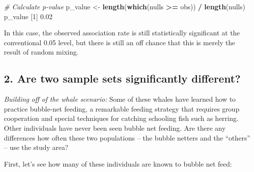 \documentclass[]{book}
\newenvironment{Shaded}{\begin{snugshade}}{\end{snugshade}}
\newcommand{\CommentTok}[1]{\textcolor[rgb]{0.56,0.35,0.01}{\textit{#1}}}
\newcommand{\DecValTok}[1]{\textcolor[rgb]{0.00,0.00,0.81}{#1}}
\newcommand{\FloatTok}[1]{\textcolor[rgb]{0.00,0.00,0.81}{#1}}
\newcommand{\KeywordTok}[1]{\textcolor[rgb]{0.13,0.29,0.53}{\textbf{#1}}}
\newcommand{\NormalTok}[1]{#1}
\newcommand{\OperatorTok}[1]{\textcolor[rgb]{0.81,0.36,0.00}{\textbf{#1}}}
\newcommand{\StringTok}[1]{\textcolor[rgb]{0.31,0.60,0.02}{#1}}
\begin{document}
\begin{Shaded}
\begin{Highlighting}[]

\CommentTok{# Calculate p-value}
\NormalTok{p_value <-}\StringTok{ }\KeywordTok{length}\NormalTok{(}\KeywordTok{which}\NormalTok{(nulls }\OperatorTok{>=}\StringTok{ }\NormalTok{obs)) }\OperatorTok{/}\StringTok{ }\KeywordTok{length}\NormalTok{(nulls)}
\NormalTok{p_value}
\NormalTok{[}\DecValTok{1}\NormalTok{] }\FloatTok{0.02}
\end{Highlighting}
\end{Shaded}

In this case, the observed association rate is still statistically significant at the conventional 0.05 level, but there is still an off chance that this is merely the result of random mixing.

\hypertarget{are-two-sample-sets-significantly-different}{%
\subsection*{2. Are two sample sets significantly different?}\label{are-two-sample-sets-significantly-different}}

\emph{Building off of the whale scenario:} Some of these whales have learned how to practice bubble-net feeding, a remarkable feeding strategy that requires group cooperation and special techniques for catching schooling fish such as herring. Other individuals have never been seen bubble net feeding. Are there any differences how often these two populations -- the bubble netters and the ``others'' -- use the study area?

First, let's see how many of these individuals are known to bubble net feed:

\begin{Shaded}
\end{Shaded}
\end{document}
